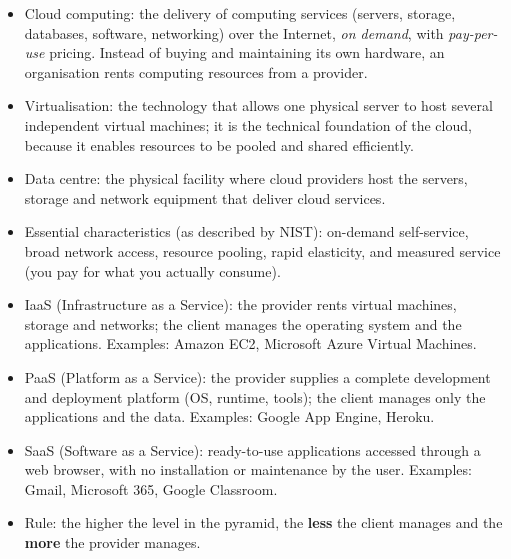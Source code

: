 \documentclass[11pt]{article}
\newcommand{\cle}[1]{{\popxbold\color{popdark}#1}}
\begin{document}
\begin{aretenir}
\begin{itemize}
  \item \cle{Cloud computing}: the delivery of computing services (servers, storage, databases, software, networking) over the Internet, \emph{on demand}, with \emph{pay-per-use} pricing. Instead of buying and maintaining its own hardware, an organisation rents computing resources from a provider.
  \item \cle{Virtualisation}: the technology that allows one physical server to host several independent virtual machines; it is the technical foundation of the cloud, because it enables resources to be pooled and shared efficiently.
  \item \cle{Data centre}: the physical facility where cloud providers host the servers, storage and network equipment that deliver cloud services.
  \item Essential characteristics (as described by NIST): on-demand self-service, broad network access, resource pooling, rapid elasticity, and measured service (you pay for what you actually consume).
\end{itemize}
\end{aretenir}

\begin{aretenir}
\begin{itemize}
  \item \cle{IaaS} (Infrastructure as a Service): the provider rents virtual machines, storage and networks; the client manages the operating system and the applications. Examples: Amazon EC2, Microsoft Azure Virtual Machines.
  \item \cle{PaaS} (Platform as a Service): the provider supplies a complete development and deployment platform (OS, runtime, tools); the client manages only the applications and the data. Examples: Google App Engine, Heroku.
  \item \cle{SaaS} (Software as a Service): ready-to-use applications accessed through a web browser, with no installation or maintenance by the user. Examples: Gmail, Microsoft 365, Google Classroom.
  \item Rule: the higher the level in the pyramid, the \textbf{less} the client manages and the \textbf{more} the provider manages.
\end{itemize}
\end{aretenir}
\end{document}
